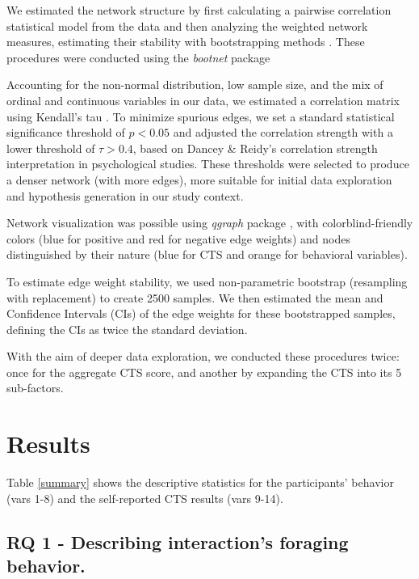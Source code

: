 \documentclass[sn-mathphys, Numbered]{sn-jnl}%
\theoremstyle{thmstyleone}%
\theoremstyle{thmstyletwo}%
\theoremstyle{thmstylethree}%
\begin{document}
We estimated the network structure by first calculating a pairwise correlation statistical model from the data and then analyzing the weighted network measures, estimating their stability with bootstrapping methods \parencite{kotz_bootstrap_1992, hevey_network_2018}. These procedures were conducted using the \textit{bootnet} package \parencite{epskamp_estimating_2018}

Accounting for the non-normal distribution, low sample size, and the mix of ordinal and continuous variables in our data, we estimated a correlation matrix using Kendall's tau \parencite*{kendall_rank_1949}.  To minimize spurious edges, we set a standard statistical significance threshold of $p < 0.05$ and adjusted the correlation strength with a lower threshold of $\tau > 0.4$, based on Dancey \& Reidy's \parencite*{dancey_statistics_2007} correlation strength interpretation in psychological studies.
These thresholds were selected to produce a denser network (with more edges), more suitable for initial data exploration and hypothesis generation in our study context.

Network visualization was possible using \textit{qgraph} package \parencite{epskamp_qgraph_2012}, with colorblind-friendly colors (blue for positive and red for negative edge weights) and nodes distinguished by their nature (blue for CTS and orange for behavioral variables).

To estimate edge weight stability, we used non-parametric bootstrap (resampling with replacement) to create 2500 samples. We then estimated the mean and Confidence Intervals (CIs) of the edge weights for these bootstrapped samples, defining the CIs as twice the standard deviation. 

With the aim of deeper data exploration, we conducted these procedures twice: once for the aggregate CTS score, and another by expanding the CTS into its 5 sub-factors.

\section{Results}

Table \ref{summary} shows the descriptive statistics for the participants' behavior (vars 1-8) and the self-reported CTS results (vars 9-14).

\subsection*{RQ 1 - Describing interaction's foraging behavior.}
\end{document}

